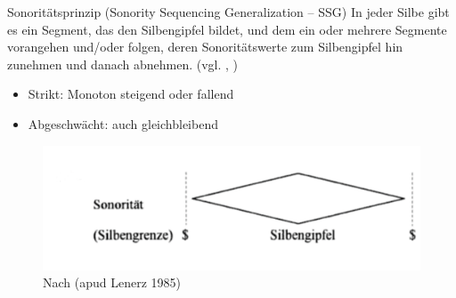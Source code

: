 \begin{frame}


\begin{block}{Sonoritätsprinzip (Sonority Sequencing Generalization -- SSG)}
In jeder Silbe gibt es ein Segment, das den Silbengipfel bildet, und dem ein oder mehrere Segmente vorangehen und/oder folgen, deren Sonoritätswerte zum Silbengipfel hin zunehmen und danach abnehmen. (vgl. \citealt[225]{Hall00a}, \citealt[94]{Ramers08a})
\end{block}

\begin{itemize}
	\item Strikt: Monoton steigend oder fallend
	\item Abgeschwächt: auch gleichbleibend \citep[vgl.][]{Hall00a}

\end{itemize}

\begin{figure}
\centering
\includegraphics[scale=.2]{material/03bSonoritaetRamers}
\caption{Nach \citet[93]{Ramers08a} (apud Lenerz 1985)}
\end{figure}

\end{frame}




